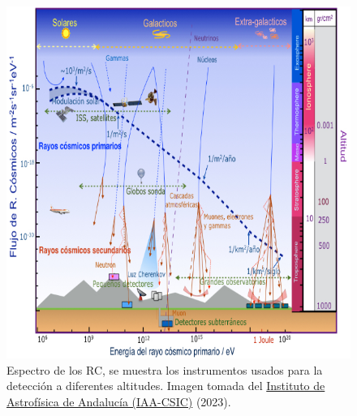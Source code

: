 \begin{frame}{}
\begin{columns}
            \begin{column}{0.4\textwidth} %
                \begin{figure}
                    \centering
                    \includegraphics[width=1.0\textwidth]{Figures/spectrum2.png}
                    \caption{\tiny Espectro de los RC, se muestra los instrumentos usados para la detección a diferentes altitudes. Imagen tomada del \href{https://revista.iaa.csic.es/content/portada/404/69}{Instituto de Astrofísica de Andalucía (IAA-CSIC)} (2023).}                    
                \end{figure}
            \end{column}
        \end{columns}
    \end{frame}

        
